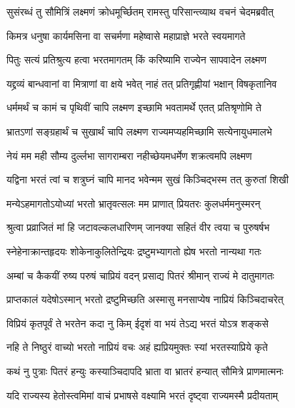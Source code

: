 
\twolineshloka
{सुसंरब्धं तु सौमित्रिं लक्ष्मणं क्रोधमूर्च्छितम्}
{रामस्तु परिसान्त्व्याथ वचनं चेदमब्रवीत्} %

\twolineshloka
{किमत्र धनुषा कार्यमसिना वा सचर्मणा}
{महेष्वासे महाप्राज्ञे भरते स्वयमागते} %

\twolineshloka
{पितुः सत्यं प्रतिश्रुत्य हत्वा भरतमागतम्}
{किं करिष्यामि राज्येन सापवादेन लक्ष्मण} %

\twolineshloka
{यद्द्रव्यं बान्धवानां वा मित्राणां वा क्षये भवेत्}
{नाहं तत् प्रतिगृह्णीयां भक्षान् विषकृतानिव} %

\twolineshloka
{धर्ममर्थं च कामं च पृथिवीं चापि लक्ष्मण}
{इच्छामि भवतामर्थे एतत् प्रतिश्रृणोमि ते} %

\twolineshloka
{भ्रातऽणां सङ्ग्रहार्थं च सुखार्थं चापि लक्ष्मण}
{राज्यमप्यहमिच्छामि सत्येनायुधमालभे} %

\twolineshloka
{नेयं मम मही सौम्य दुर्ल्लभा सागराम्बरा}
{नहीच्छेयमधर्मेण शक्रत्वमपि लक्ष्मण} %

\twolineshloka
{यद्विना भरतं त्वां च शत्रुघ्नं चापि मानद}
{भवेन्मम सुखं किञ्चिद्भस्म तत् कुरुतां शिखी} %

\twolineshloka
{मन्येऽहमागतोऽयोध्यां भरतो भ्रातृवत्सलः}
{मम प्राणात् प्रियतरः कुलधर्ममनुस्मरन्} %

\twolineshloka
{श्रुत्वा प्रव्राजितं मां हि जटावल्कलधारिणम्}
{जानक्या सहितं वीर त्वया च पुरुषर्षभ} %

\twolineshloka
{स्नेहेनाक्रान्तहृदयः शोकेनाकुलितेन्द्रियः}
{द्रष्टुमभ्यागतो ह्येष भरतो नान्यथा गतः} %

\twolineshloka
{अम्बां च कैकयीं रुष्य परुषं चाप्रियं वदन्}
{प्रसाद्य पितरं श्रीमान् राज्यं मे दातुमागतः} %

\twolineshloka
{प्राप्तकालं यदेषोऽस्मान् भरतो द्रष्टुमिच्छति}
{अस्मासु मनसाप्येष नाप्रियं किञ्चिदाचरेत्} %

\twolineshloka
{विप्रियं कृतपूर्वं ते भरतेन कदा नु किम्}
{ईदृशं वा भयं तेऽद्य भरतं योऽत्र शङ्कसे} %

\twolineshloka
{नहि ते निष्ठुरं वाच्यो भरतो नाप्रियं वचः}
{अहं ह्यप्रियमुक्तः स्यां भरतस्याप्रिये कृते} %

\twolineshloka
{कथं नु पुत्राः पितरं हन्युः कस्याञ्चिदापदि}
{भ्राता वा भ्रातरं हन्यात् सौमित्रे प्राणमात्मनः} %

\twolineshloka
{यदि राज्यस्य हेतोस्त्वमिमां वाचं प्रभाषसे}
{वक्ष्यामि भरतं दृष्ट्वा राज्यमस्मै प्रदीयताम्} %

